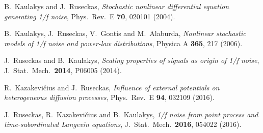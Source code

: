\documentclass{article}
\begin{document}
\begin{thebibliography}{1}
B.~Kaulakys and J.~Ruseckas, \textit{Stochastic
nonlinear differential equation generating 1/f noise}, Phys.~Rev.~E
\textbf{70}, 020101 (2004).

B.~Kaulakys, J.~Ruseckas, V.~Gontis and
M.~Alaburda, \textit{Nonlinear stochastic models of 1/f noise and power-law
distributions}, Physica A \textbf{365}, 217 (2006).

J.~Ruseckas and B.~Kaulakys, \textit{Scaling
properties of signals as origin of 1/f noise}, J.~Stat.~Mech.\ \textbf{2014},
P06005 (2014).

R.~Kazakevi\v{c}ius and J.~Ruseckas,
\textit{Influence of external potentials on heterogeneous diffusion
processes}, Phys.~Rev.~E \textbf{94}, 032109 (2016).

J.~Ruseckas, R.~Kazakevi\v{c}ius and B.~Kaulakys,
\textit{1/f noise from point process and time-subordinated Langevin
equations}, J.~Stat.~Mech.\ \textbf{2016}, 054022 (2016).
\end{thebibliography}
\end{document}
